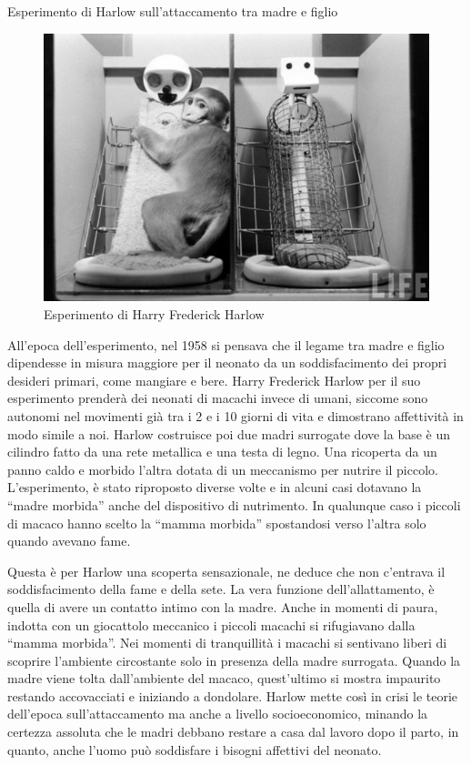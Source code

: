 \documentclass[12pt]{book} %
\begin{document}
\needspace{4cm}
\begin{mdframed}[linewidth=1pt]
Esperimento di Harlow sull'attaccamento tra madre e figlio 

\needspace{4cm}
\begin{figure}
  \centering
  \includegraphics[width=0.95\linewidth]{images/Libro-img017.jpg}
  \begin{minipage}{\linewidth}
    \caption{Esperimento di Harry Frederick Harlow}
  \end{minipage}
\end{figure}

All'epoca dell'esperimento, nel 1958 si pensava che il legame tra madre e
figlio dipendesse in misura maggiore per il neonato da un soddisfacimento dei propri desideri primari, come
mangiare e bere. Harry Frederick Harlow per il suo esperimento prenderà dei neonati di macachi invece di umani, siccome
sono autonomi nel movimenti già tra i 2 e i 10 giorni di vita e dimostrano affettività in modo simile a noi. Harlow
costruisce poi due madri surrogate dove la base è un cilindro fatto da una rete metallica e una testa di legno. Una
ricoperta da un panno caldo e morbido l'altra dotata di un meccanismo per nutrire il piccolo.
L'esperimento, è stato riproposto diverse volte e in alcuni casi dotavano la “madre morbida” anche
del dispositivo di nutrimento. In qualunque caso i piccoli di macaco hanno scelto la “mamma morbida” spostandosi
verso l'altra solo quando avevano fame.

Questa è per Harlow una scoperta sensazionale, ne deduce che non c'entrava il soddisfacimento della fame e della sete. La vera funzione dell'allattamento, è quella di avere un contatto intimo
con la madre. Anche in momenti di paura, indotta con un giocattolo meccanico i piccoli macachi si rifugiavano dalla “mamma morbida”. Nei momenti di tranquillità i macachi si sentivano liberi di scoprire
l'ambiente circostante solo in presenza della madre surrogata. Quando la madre viene tolta
dall'ambiente del macaco, quest'ultimo si mostra impaurito restando
accovacciati e iniziando a dondolare. Harlow mette così in crisi le teorie dell'epoca
sull'attaccamento ma anche a livello socioeconomico, minando la certezza assoluta che le madri
debbano restare a casa dal lavoro dopo il parto, in quanto, anche l'uomo può soddisfare i bisogni affettivi del neonato.


\end{mdframed}
\end{document}
